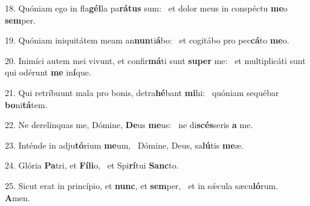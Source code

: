 18. Quóniam ego in fla\textbf{gél}la pa\textbf{rá}\textbf{tus} sum: \ast\  et dolor meus in conspéctu \textbf{me}o \textbf{sem}per.\

19. Quóniam iniquitátem meam an\textbf{nun}ti\textbf{á}bo: \ast\  et cogitábo pro pec\textbf{cá}to \textbf{me}o.\

20. Inimíci autem mei vivunt, et confir\textbf{má}ti sunt \textbf{su}\textbf{per} me: \ast\  et multiplicáti sunt qui odérunt \textbf{me} in\textbf{í}que.\

21. Qui retríbuunt mala pro bonis, detra\textbf{hé}bant \textbf{mi}hi: \ast\  quóniam sequébar \textbf{bo}ni\textbf{tá}tem.\

22. Ne derelínquas me, Dómine, \textbf{De}us \textbf{me}us: \ast\  ne di\textbf{scés}seris \textbf{a} me.\

23. Inténde in adju\textbf{tó}rium \textbf{me}um, \ast\  Dómine, Deus, sa\textbf{lú}tis \textbf{me}æ.\

24. Glória \textbf{Pa}tri, et \textbf{Fí}\textbf{li}o, \ast\  et Spi\textbf{rí}tui \textbf{Sanc}to.\

25. Sicut erat in princípio, et \textbf{nunc}, et \textbf{sem}per, \ast\  et in sǽcula sæcu\textbf{ló}rum. \textbf{A}men.\

